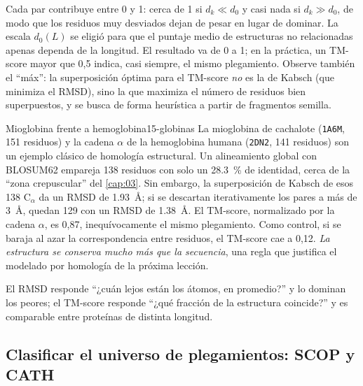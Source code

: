 Cada par contribuye entre 0 y 1: cerca de 1 si $d_k\ll d_0$ y casi nada si $d_k\gg d_0$, de modo que los residuos muy desviados dejan de pesar en lugar de dominar. La escala $d_0(L)$ se eligió para que el puntaje medio de estructuras no relacionadas apenas dependa de la longitud. El resultado va de 0 a 1; en la práctica, un TM-score mayor que 0,5 indica, casi siempre, el mismo plegamiento. Observe también el ``máx'': la superposición óptima para el TM-score \emph{no} es la de Kabsch (que minimiza el RMSD), sino la que maximiza el número de residuos bien superpuestos, y se busca de forma heurística a partir de fragmentos semilla.

\begin{ejemplo}{Mioglobina frente a hemoglobina}{15-globinas}
La mioglobina de cachalote (\texttt{1A6M}, 151 residuos) y la cadena $\alpha$ de la hemoglobina humana (\texttt{2DN2}, 141 residuos) son un ejemplo clásico de homología estructural. Un alineamiento global con BLOSUM62 empareja 138 residuos con solo un \SI{28,3}{\percent} de identidad, cerca de la ``zona crepuscular'' del \cref{cap:03}. Sin embargo, la superposición de Kabsch de esos 138 C$_\alpha$ da un RMSD de \SI{1,93}{\angstrom}; si se descartan iterativamente los pares a más de \SI{3}{\angstrom}, quedan 129 con un RMSD de \SI{1,38}{\angstrom}. El TM-score, normalizado por la cadena $\alpha$, es 0,87, inequívocamente el mismo plegamiento. Como control, si se baraja al azar la correspondencia entre residuos, el TM-score cae a 0,12. \emph{La estructura se conserva mucho más que la secuencia}, una regla que justifica el modelado por homología de la próxima lección.
\end{ejemplo}

\begin{ideaclave}
El RMSD responde ``¿cuán lejos están los átomos, en promedio?'' y lo dominan los peores; el TM-score responde ``¿qué fracción de la estructura coincide?'' y es comparable entre proteínas de distinta longitud.
\end{ideaclave}

\subsection{Clasificar el universo de plegamientos: SCOP y CATH}

